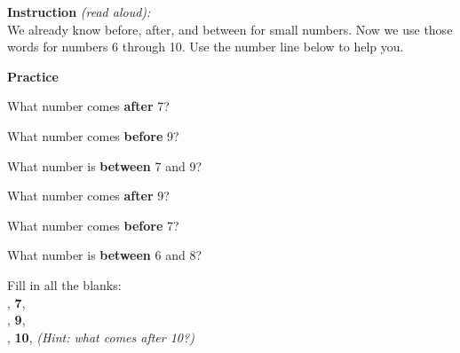 \documentclass[12pt,letterpaper]{article}
\begin{document}

\begin{instructbox}
\noindent\textbf{\color{sd-blue}Instruction} \textit{(read aloud):}\\[4pt]
We already know before, after, and between for small numbers.
Now we use those words for numbers 6 through 10.
Use the number line below to help you.
\end{instructbox}

\vspace{6pt}
\begin{center}
\end{center}

\goldrule
\noindent\textbf{\color{sd-blue}Practice}
\vspace{6pt}

\prob What number comes \textbf{after} 7? \quad\ansblank

\vspace{8pt}
\prob What number comes \textbf{before} 9? \quad\ansblank

\vspace{8pt}
\prob What number is \textbf{between} 7 and 9? \quad\ansblank

\vspace{8pt}
\prob What number comes \textbf{after} 9? \quad\ansblank

\vspace{8pt}
\prob What number comes \textbf{before} 7? \quad\ansblank

\vspace{8pt}
\prob What number is \textbf{between} 6 and 8? \quad\ansblank

\vspace{8pt}
\prob Fill in all the blanks:\\[8pt]
\hspace{1cm}\ansblank, \textbf{7}, \ansblank\\[8pt]
\hspace{1cm}\ansblank, \textbf{9}, \ansblank\\[8pt]
\hspace{1cm}\ansblank, \textbf{10}, \ansblank \quad\textit{(Hint: what comes after 10?)}
\end{document}
